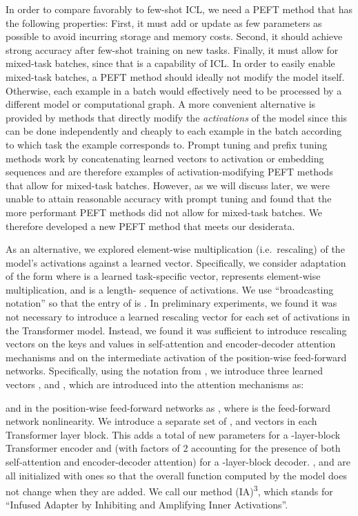 \documentclass{article}
\newcommand{\ia}{{\fontfamily{lmtt}\selectfont (IA)\textsuperscript{3}}\xspace}
\begin{document}
In order to compare favorably to few-shot ICL, we need a PEFT method that has the following properties:
First, it must add or update as few parameters as possible to avoid incurring storage and memory costs.
Second, it should achieve strong accuracy after few-shot training on new tasks.
Finally, it must allow for mixed-task batches, since that is a capability of ICL.
In order to easily enable mixed-task batches, a PEFT method should ideally not modify the model itself.
Otherwise, each example in a batch would effectively need to be processed by a different model or computational graph.
A more convenient alternative is provided by methods that directly modify the \textit{activations} of the model since this can be done independently and cheaply to each example in the batch according to which task the example corresponds to.
Prompt tuning and prefix tuning methods \citep{lester2021power,li2021prefix} work by concatenating learned vectors to activation or embedding sequences and are therefore examples of activation-modifying PEFT methods that allow for mixed-task batches.
However, as we will discuss later, we were unable to attain reasonable accuracy with prompt tuning and found that the more performant PEFT methods did not allow for mixed-task batches.
We therefore developed a new PEFT method that meets our desiderata.

As an alternative, we explored element-wise multiplication (i.e.\ rescaling) of the model's activations against a learned vector.
Specifically, we consider adaptation of the form  where  is a learned task-specific vector,  represents element-wise multiplication, and  is a length- sequence of activations.
We use ``broadcasting notation'' \cite{van2011numpy} so that the  entry of  is .
In preliminary experiments, we found it was not necessary to introduce a learned rescaling vector for each set of activations in the Transformer model.
Instead, we found it was sufficient to introduce rescaling vectors on the keys and values in self-attention and encoder-decoder attention mechanisms and on the intermediate activation of the position-wise feed-forward networks.
Specifically, using the notation from \citet{vaswani2017attention}, we introduce three learned vectors , and , which are introduced into the attention mechanisms as:

and in the position-wise feed-forward networks as , where  is the feed-forward network nonlinearity.
We introduce a separate set of , and  vectors in each Transformer layer block.
This adds a total of  new parameters for a -layer-block Transformer encoder and  (with factors of 2 accounting for the presence of both self-attention and encoder-decoder attention) for a -layer-block decoder.
, and  are all initialized with ones so that the overall function computed by the model does not change when they are added.
We call our method \ia, which stands for ``Infused Adapter by Inhibiting and Amplifying Inner Activations''.
\end{document}
